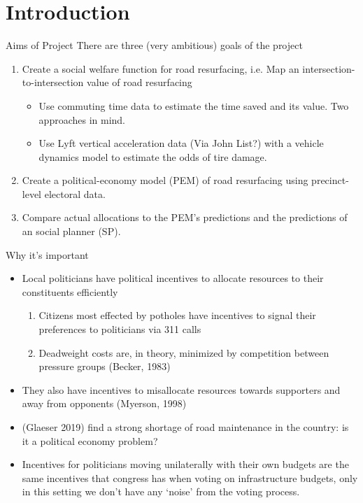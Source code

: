 \section{Introduction}
\begin{frame}{Aims of Project}
There are three (very ambitious) goals of the project
\begin{enumerate}
    \item Create a social welfare function for road resurfacing, i.e. Map an intersection-to-intersection value of road resurfacing 
    \begin{itemize}
        \item Use commuting time data to estimate the time saved and its value. Two approaches in mind.
        \item Use Lyft vertical acceleration data (Via John List?) with a vehicle dynamics model to estimate the odds of tire damage.
    \end{itemize}
    \item Create a political-economy model (PEM) of road resurfacing using precinct-level electoral data.
    \item Compare actual allocations to the PEM's predictions and the predictions of an social planner (SP).
\end{enumerate}
\end{frame}
\begin{frame}{Why it's important}
    \begin{itemize}
        \item Local politicians have political incentives to allocate resources to their constituents efficiently
        \begin{enumerate}
            \item Citizens most effected by potholes have incentives to signal their preferences to politicians via 311 calls
            \item Deadweight costs are, in theory, minimized by competition between pressure groups (Becker, 1983)
        \end{enumerate} 
        \item They also have incentives to misallocate resources towards supporters and away from opponents (Myerson, 1998)
        \item (Glaeser 2019) find a strong shortage of road maintenance in the country: is it a political economy problem?
        \item Incentives for politicians moving unilaterally with their own budgets are the same incentives that congress has when voting on infrastructure budgets, only in this setting we don't have any `noise' from the voting process. 
    \end{itemize}
    \end{frame}
    

